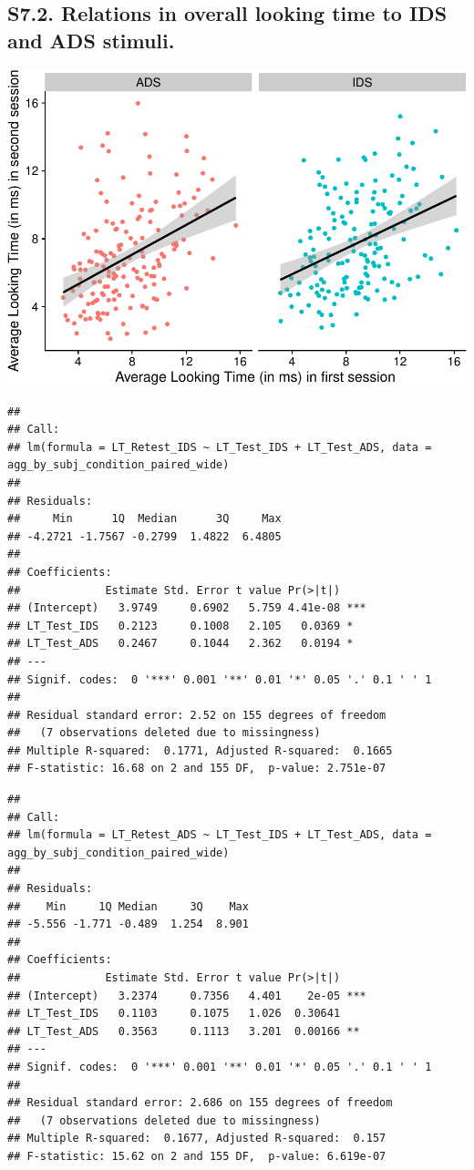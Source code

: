 \documentclass[
  man, donotrepeattitle,floatsintext]{apa6}
\begin{document}
\hypertarget{s7.2.-relations-in-overall-looking-time-to-ids-and-ads-stimuli.}{%
\subsection{S7.2. Relations in overall looking time to IDS and ADS stimuli.}\label{s7.2.-relations-in-overall-looking-time-to-ids-and-ads-stimuli.}}

\includegraphics{MB1T_supplement_files/figure-latex/unnamed-chunk-10-1.pdf}

\begin{verbatim}
## 
## Call:
## lm(formula = LT_Retest_IDS ~ LT_Test_IDS + LT_Test_ADS, data = agg_by_subj_condition_paired_wide)
## 
## Residuals:
##     Min      1Q  Median      3Q     Max 
## -4.2721 -1.7567 -0.2799  1.4822  6.4805 
## 
## Coefficients:
##             Estimate Std. Error t value Pr(>|t|)    
## (Intercept)   3.9749     0.6902   5.759 4.41e-08 ***
## LT_Test_IDS   0.2123     0.1008   2.105   0.0369 *  
## LT_Test_ADS   0.2467     0.1044   2.362   0.0194 *  
## ---
## Signif. codes:  0 '***' 0.001 '**' 0.01 '*' 0.05 '.' 0.1 ' ' 1
## 
## Residual standard error: 2.52 on 155 degrees of freedom
##   (7 observations deleted due to missingness)
## Multiple R-squared:  0.1771, Adjusted R-squared:  0.1665 
## F-statistic: 16.68 on 2 and 155 DF,  p-value: 2.751e-07
\end{verbatim}

\begin{verbatim}
## 
## Call:
## lm(formula = LT_Retest_ADS ~ LT_Test_IDS + LT_Test_ADS, data = agg_by_subj_condition_paired_wide)
## 
## Residuals:
##    Min     1Q Median     3Q    Max 
## -5.556 -1.771 -0.489  1.254  8.901 
## 
## Coefficients:
##             Estimate Std. Error t value Pr(>|t|)    
## (Intercept)   3.2374     0.7356   4.401    2e-05 ***
## LT_Test_IDS   0.1103     0.1075   1.026  0.30641    
## LT_Test_ADS   0.3563     0.1113   3.201  0.00166 ** 
## ---
## Signif. codes:  0 '***' 0.001 '**' 0.01 '*' 0.05 '.' 0.1 ' ' 1
## 
## Residual standard error: 2.686 on 155 degrees of freedom
##   (7 observations deleted due to missingness)
## Multiple R-squared:  0.1677, Adjusted R-squared:  0.157 
## F-statistic: 15.62 on 2 and 155 DF,  p-value: 6.619e-07
\end{verbatim}
\end{document}
